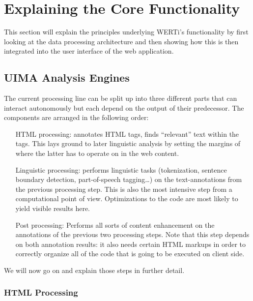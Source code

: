 \documentclass{article}
\begin{document}
\section{Explaining the Core Functionality}

This section will explain the principles underlying WERTi's functionality by
first looking at the data processing architecture and then showing how this is
then integrated into the user interface of the web application.

\subsection{UIMA Analysis Engines}

The current processing line can be split up into three different parts that can
interact autonomously but each depend on the output of their predecessor. The
components are arranged in the following order:

\begin{itemize}

\item[HTML processing:] annotates HTML tags, finds ``relevant'' text within the
tags. This lays ground to later linguistic analysis by setting the margins of
where the latter has to operate on in the web content.

\item[Linguistic processing:] performs linguistic tasks (tokenization, sentence
boundary detection, part-of-speech tagging\ldots{}) on the text-annotations
from the previous processing step. This is also the most intensive step from a
computational point of view. Optimizations to the code are most likely to yield
visible results here.

\item[Post processing:] Performs all sorts of content enhancement on the
annotations of the previous two processing steps. Note that this step depends on
both annotation results: it also needs certain HTML markups in order to
correctly organize all of the code that is going to be executed on client side.


\end{itemize}

We will now go on and explain those steps in further detail.

\subsubsection{HTML Processing}
\end{document}
